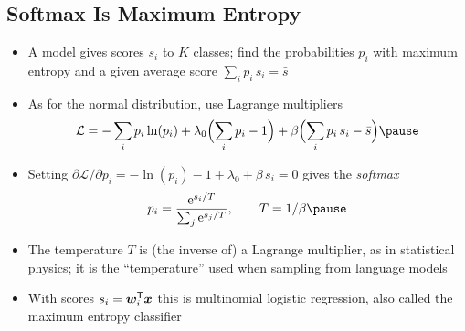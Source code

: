 \begin{slide}
\section[-2]{Softmax Is Maximum Entropy}

\begin{PauseHighLight}\small
  \begin{itemize}
  \item A model gives scores $s_i$ to $K$ classes; find the
    probabilities $p_i$ with maximum entropy and a given average score
    $\sum_i p_i\,s_i = \bar{s}$\pause
  \item As for the normal distribution, use Lagrange multipliers
    \begin{align*}
      \mathcal{L} = -\sum_i p_i \ln(p_i) + \lambda_0\Bigl(\sum_i p_i -1\Bigr)
      + \beta\Bigl(\sum_i p_i\, s_i - \bar{s}\Bigr)\pause
    \end{align*}
  \item Setting $\partial\mathcal{L}/\partial p_i = -\ln(p_i) - 1 +
    \lambda_0 + \beta\,s_i = 0$ gives the \emph{softmax}
    \begin{align*}
      p_i = \frac{\e{s_i/T}}{\sum_j \e{s_j/T}}, \qquad T = 1/\beta\pause
    \end{align*}
  \item The temperature $T$ is (the inverse of) a Lagrange multiplier,
    as in statistical physics\pause{}; it is the ``temperature'' used
    when sampling from language models\pauseb
  \item With scores $s_i = \bm{w}_i^{\textsf{T}}\bm{x}$ this is multinomial
    logistic regression, also called the maximum entropy
    classifier\pause
  \end{itemize}
\end{PauseHighLight}

\end{slide}




